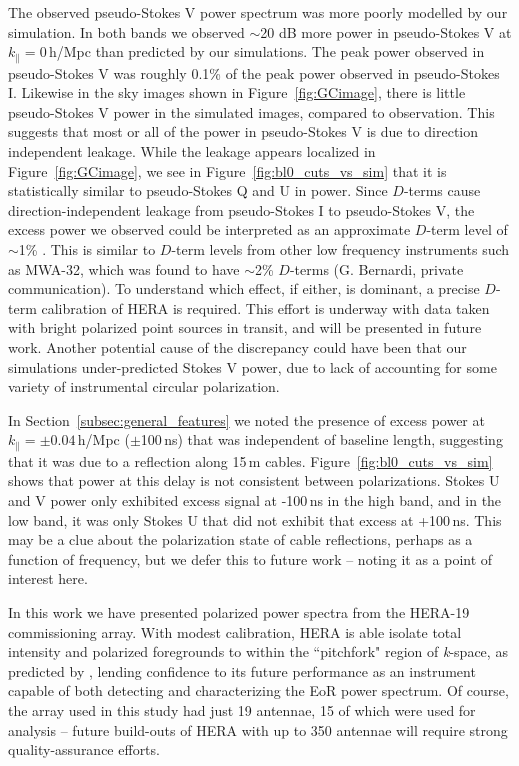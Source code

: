 \documentclass[twocolumn, trackchanges]{aastex61}
\begin{document}
The observed pseudo-Stokes V power spectrum was more poorly modelled by our simulation. In both bands we observed $\sim$20 dB more power in pseudo-Stokes V at $k_{\parallel}=0$\,h/Mpc than predicted by our simulations. The peak power observed in pseudo-Stokes V was roughly 0.1\% of the peak power observed in pseudo-Stokes I. Likewise in the sky images shown in Figure~\ref{fig:GCimage}, there is little pseudo-Stokes V power in the simulated images, compared to observation. This suggests that most or all of the power in pseudo-Stokes V is due to direction independent leakage. While the leakage appears localized in Figure~\ref{fig:GCimage}, we see in Figure~\ref{fig:bl0_cuts_vs_sim} that it is statistically similar to pseudo-Stokes Q and U in power.
Since $D$-terms cause direction-independent leakage from pseudo-Stokes I to pseudo-Stokes V, the excess power we observed could be interpreted as an approximate $D$-term level of $\sim$1\% \citep{TMS}. This is similar to $D$-term levels from other low frequency instruments such as MWA-32, which was found to have $\sim$2\% $D$-terms (G. Bernardi, private communication).
To understand which effect, if either, is dominant, a precise $D$-term calibration of HERA is required. This effort is underway with data taken with bright polarized point sources in transit, and will be presented in future work. Another potential cause of the discrepancy could have been that our simulations under-predicted Stokes V power, due to lack of accounting for some variety of instrumental circular polarization.

In Section~\ref{subsec:general_features} we noted the presence of excess power at $k_{\parallel}=\pm 0.04$\,h/Mpc ($\pm$100\,ns) that was independent of baseline length, suggesting that it was due to a reflection along 15\,m cables. Figure~\ref{fig:bl0_cuts_vs_sim} shows that power at this delay is not consistent between polarizations. Stokes U and V power only exhibited excess signal at -100\,ns in the high band, and in the low band, it was only Stokes U that did not exhibit that excess at +100\,ns. This may be a clue about the polarization state of cable reflections, perhaps as a function of frequency, but we defer this to future work -- noting it as a point of interest here.

\label{conc}

In this work we have presented polarized power spectra from the HERA-19 commissioning array. With modest calibration, HERA is able isolate total intensity and polarized foregrounds to within the ``pitchfork" region of \textit{k}-space, as predicted by \cite{Nithya.15b}, lending confidence to its future performance as an instrument capable of both detecting and characterizing the EoR power spectrum. Of course, the array used in this study had just 19 antennae, 15 of which were used for analysis -- future build-outs of HERA with up to 350 antennae will require strong quality-assurance efforts. %
\end{document}
